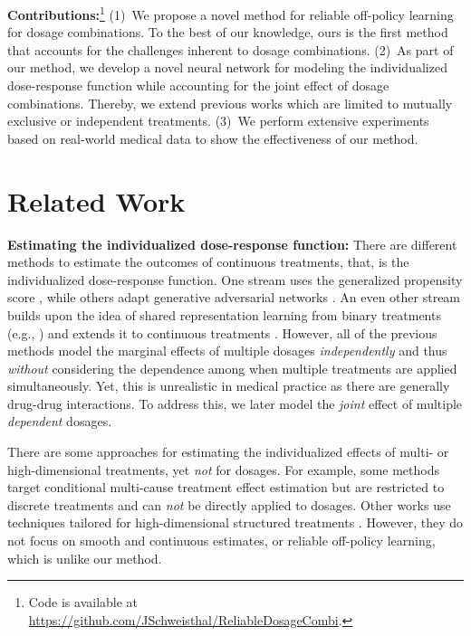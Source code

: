 \documentclass{article}
\theoremstyle{definition}
\theoremstyle{plain}
\begin{document}
\textbf{Contributions:}\footnote{Code is available at \url{https://github.com/JSchweisthal/ReliableDosageCombi}.} (1)~We propose a novel method for reliable off-policy learning for dosage combinations. To the best of our knowledge, ours is the first method that accounts for the challenges inherent to dosage combinations. (2)~As part of our method, we develop a novel neural network for modeling the individualized dose-response function while accounting for the joint effect of dosage combinations. Thereby, we extend previous works which are limited to mutually exclusive or independent treatments. (3)~We perform extensive experiments based on real-world medical data to show the effectiveness of our method. 


\section{Related Work}  \label{sec:related_work}

\textbf{Estimating the individualized dose-response function:}
There are different methods to estimate the outcomes of continuous treatments, that, is the individualized dose-response function. One stream uses the generalized propensity score \cite{Hirano.2004, Imai.2004, Imbens.2000}, while others adapt generative adversarial networks \cite{Bica.2020c}. An even other stream builds upon the idea of shared representation learning from binary treatments (e.g., \cite{Johansson.2016, Kuzmanovic.2023, Shalit.2017, Shi.2019, Zhang.2020}) and extends it to continuous treatments \cite{Nie.2021b,Schwab.2020}. However, all of the previous methods model the marginal effects of multiple dosages \emph{independently} and thus \emph{without} considering the dependence among when multiple treatments are applied simultaneously. Yet, this is unrealistic in medical practice as there are generally drug-drug interactions. To address this, we later model the \emph{joint} effect of multiple \emph{dependent} dosages.

There are some approaches for estimating the individualized effects of multi- or high-dimensional treatments, yet \emph{not} for dosages. For example, some methods target conditional multi-cause treatment effect estimation \cite{Nandy.2017, Parbhoo.2021, Qian.2021, Tanimoto.2021, Wang.2019, Zou.2020} but are restricted to discrete treatments and can \emph{not} be directly applied to dosages. Other works use techniques tailored for high-dimensional structured treatments \cite{Harada.2021, Kaddour.2021, Nabi.2022b}. However, they do not focus on smooth and continuous estimates, or reliable off-policy learning, which is unlike our method.
\end{document}
